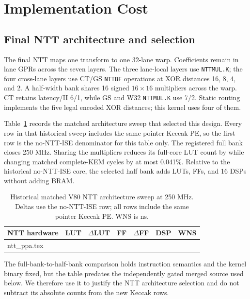 \documentclass[conference,letterpaper]{IEEEtran}
\makeatletter
\newcommand{\tablerows}[1]{\@@input #1 }
\newcommand{\code}[1]{\texttt{#1}}
\newcommand{\src}[1]{\par\smallskip{\scriptsize Source: \nolinkurl{#1}.}}
\makeatother
\begin{document}
\section{Implementation Cost}
\subsection{Final NTT architecture and selection}
The final NTT maps one transform to one 32-lane warp. Coefficients remain in
lane GPRs across the seven layers. The three lane-local layers use
\code{NTTMUL.K}; the four cross-lane layers use CT/GS \code{NTTBF} operations
at XOR distances 16, 8, 4, and 2. A half-width bank shares 16 signed
$16\times16$ multipliers across the warp. CT retains latency/II 6/1, while
GS and W32 \code{NTTMUL.K} use 7/2. Static routing implements the five legal
encoded XOR distances; this kernel uses four of them.

Table~\ref{tab:nttppa} records the matched architecture sweep that selected
this design. Every row in that historical sweep includes the same pointer
Keccak PE, so the first row is the no-NTT-ISE denominator for this table only.
The registered full bank closes 250 MHz. Sharing the multipliers reduces its
full-core LUT count by \HalfbankLutSaving{} while changing matched complete-KEM
cycles by at most 0.041\%. Relative to the historical no-NTT-ISE core, the
selected half bank adds \FinalNttLutOverhead{} LUTs,
\FinalNttFfOverhead{} FFs, and 16 DSPs without adding BRAM.

\begin{table}[t]
\caption{Historical matched V80 NTT architecture sweep at 250 MHz. Deltas use
the no-NTT-ISE row; all rows include the same pointer Keccak PE. WNS is ns.}
\label{tab:nttppa}
\centering\scriptsize\setlength{\tabcolsep}{2.6pt}
\begin{tabular}{@{}lrrrrrr@{}}
\toprule
NTT hardware & LUT & $\Delta$LUT & FF & $\Delta$FF & DSP & WNS \\
\midrule
\tablerows{ntt_ppa.tex}
\bottomrule
\end{tabular}
\src{pqc/results/ntt_v80_ppa.csv}
\end{table}

The full-bank-to-half-bank comparison holds instruction semantics and the
kernel binary fixed, but the table predates the independently gated merged
source used below. We therefore use it to justify the NTT architecture
selection and do not subtract its absolute counts from the new Keccak rows.
\end{document}
